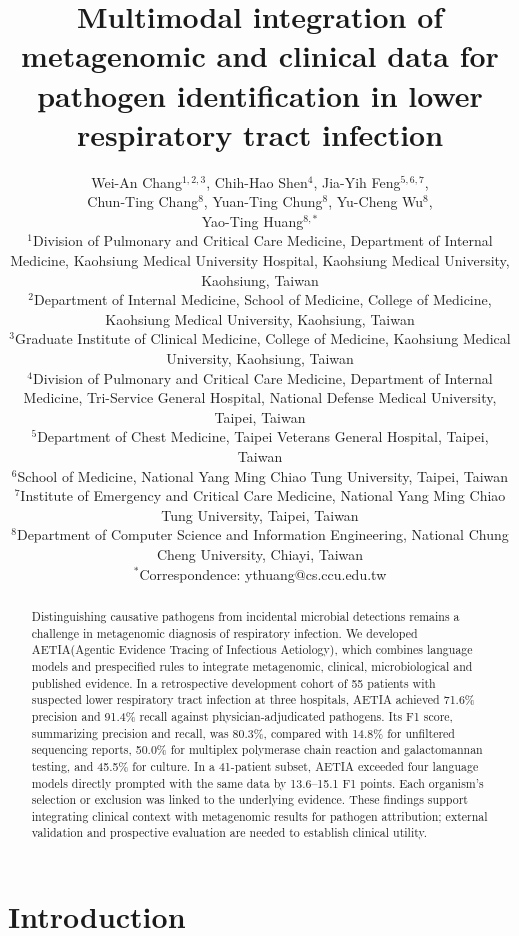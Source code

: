 \documentclass[11pt,a4paper]{article}
\title{Multimodal integration of metagenomic and clinical data for pathogen identification in lower respiratory tract infection}
\author{\parbox{\textwidth}{\centering\setlength{\baselineskip}{13pt}%
Wei-An Chang$^{1,2,3}$, Chih-Hao Shen$^{4}$, Jia-Yih Feng$^{5,6,7}$,\\
Chun-Ting Chang$^{8}$, Yuan-Ting Chung$^{8}$, Yu-Cheng Wu$^{8}$,\\
Yao-Ting Huang$^{8,\ast}$\\[4pt]
\small $^{1}$Division of Pulmonary and Critical Care Medicine, Department of Internal Medicine, Kaohsiung Medical University Hospital, Kaohsiung Medical University, Kaohsiung, Taiwan\\
\small $^{2}$Department of Internal Medicine, School of Medicine, College of Medicine, Kaohsiung Medical University, Kaohsiung, Taiwan\\
\small $^{3}$Graduate Institute of Clinical Medicine, College of Medicine, Kaohsiung Medical University, Kaohsiung, Taiwan\\
\small $^{4}$Division of Pulmonary and Critical Care Medicine, Department of Internal Medicine, Tri-Service General Hospital, National Defense Medical University, Taipei, Taiwan\\
\small $^{5}$Department of Chest Medicine, Taipei Veterans General Hospital, Taipei, Taiwan\\
\small $^{6}$School of Medicine, National Yang Ming Chiao Tung University, Taipei, Taiwan\\
\small $^{7}$Institute of Emergency and Critical Care Medicine, National Yang Ming Chiao Tung University, Taipei, Taiwan\\
\small $^{8}$Department of Computer Science and Information Engineering, National Chung Cheng University, Chiayi, Taiwan\\
\small $^{\ast}$Correspondence: ythuang@cs.ccu.edu.tw\\[4pt]
\small}}
\date{}
\newcommand{\toolname}{AETIA\xspace} %
\newcommand{\toolexpansion}{Agentic Evidence Tracing of Infectious Aetiology\xspace} %
\begin{document}
\sloppy
\onehalfspacing
\linenumbers
\maketitle

\begin{abstract}
Distinguishing causative pathogens from incidental microbial detections remains a challenge in metagenomic diagnosis of respiratory infection. We developed \toolname (\toolexpansion), which combines language models and prespecified rules to integrate metagenomic, clinical, microbiological and published evidence. In a retrospective development cohort of 55 patients with suspected lower respiratory tract infection at three hospitals, \toolname achieved 71.6\% precision and 91.4\% recall against physician-adjudicated pathogens. Its F1 score, summarizing precision and recall, was 80.3\%, compared with 14.8\% for unfiltered sequencing reports, 50.0\% for multiplex polymerase chain reaction and galactomannan testing, and 45.5\% for culture. In a 41-patient subset, \toolname exceeded four language models directly prompted with the same data by 13.6--15.1 F1 points. Each organism's selection or exclusion was linked to the underlying evidence. These findings support integrating clinical context with metagenomic results for pathogen attribution; external validation and prospective evaluation are needed to establish clinical utility.
\end{abstract}

\section*{Introduction}

\end{document}
